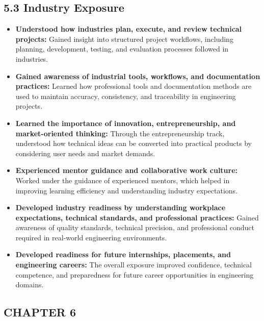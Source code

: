 \documentclass[10pt]{article}
\begin{document}
\subsection*{5.3 Industry Exposure}
\begin{itemize}

\item \textbf{Understood how industries plan, execute, and review technical projects:}  
Gained insight into structured project workflows, including planning, development, testing, and evaluation processes followed in industries.

\item \textbf{Gained awareness of industrial tools, workflows, and documentation practices:}  
Learned how professional tools and documentation methods are used to maintain accuracy, consistency, and traceability in engineering projects.

\item \textbf{Learned the importance of innovation, entrepreneurship, and market-oriented thinking:}  
Through the entrepreneurship track, understood how technical ideas can be converted into practical products by considering user needs and market demands.

\item \textbf{Experienced mentor guidance and collaborative work culture:}  
Worked under the guidance of experienced mentors, which helped in improving learning efficiency and understanding industry expectations.

\item \textbf{Developed industry readiness by understanding workplace expectations, technical standards, and professional practices:}  
Gained awareness of quality standards, technical precision, and professional conduct required in real-world engineering environments.

\item \textbf{Developed readiness for future internships, placements, and engineering careers:}  
The overall exposure improved confidence, technical competence, and preparedness for future career opportunities in engineering domains.

\end{itemize}


\newpage
{}
\begin{flushleft}
{\fontsize{16pt}{16pt}\selectfont
\section*{CHAPTER 6}}
\end{flushleft}
\end{document}
